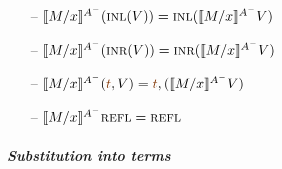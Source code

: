 \begin{itemize}
\smallskip

\item[--] $\rsubsta{M}{x}{(\tinl{V})}{A^-} 
           = \tinl{\rsubsta{M}{x}{V}{A^-}}$
\item[--] $\rsubsta{M}{x}{(\tinr{V})}{A^-} 
           = \tinr{\rsubsta{M}{x}{V}{A^-}}$
\item[--] $\rsubsta{M}{x}{(\texistsr{\lf t}{V})}{A^-} 
           = \texistsr{\lf t}{(\rsubsta{M}{x}{V}{A^-})}$
\item[--] $\rsubsta{M}{x}{\tunifr}{A^-} = \tunifr$
\end{itemize}

\paragraph{\it Substitution into terms}

